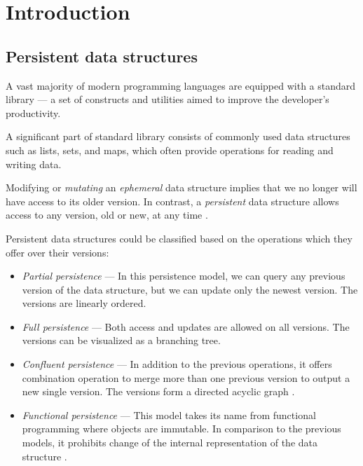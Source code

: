 \chapter{Introduction}


\section{Persistent data structures}

A vast majority of modern programming languages are equipped with a standard library --- a set of constructs and utilities aimed to improve the developer's productivity. 

A significant part of standard library consists of commonly used data structures such as lists, sets, and maps, which often provide operations for reading and writing data. 

Modifying or \emph{mutating} an \emph{ephemeral} data structure implies that we no longer will have access to its older version. In contrast, a \emph{persistent} data structure allows access to any version, old or new, at any time \cite{making-data-structures-persistent}. 

Persistent data structures could be classified based on the operations which they offer over their versions:
\begin{itemize}
    \item \textit{Partial persistence} --- In this persistence model, we can query any previous version of the data structure, but we can update only the newest version. The versions are linearly ordered. 
    \item \textit{Full persistence} --- Both access and updates are allowed on all versions. The versions can be visualized as a branching tree.
    \item \textit{Confluent persistence} --- In addition to the previous operations, it offers combination operation to merge more than one previous version to output a new single version. The versions form a directed acyclic graph \cite{fully-persistent-lists-with-catenation}.  
    \item \textit{Functional persistence} --- This model takes its name from functional programming where objects are immutable. In comparison to the previous models, it prohibits change of the internal representation of the data structure \cite{purely-functional-data-structures}. 
\end{itemize}

